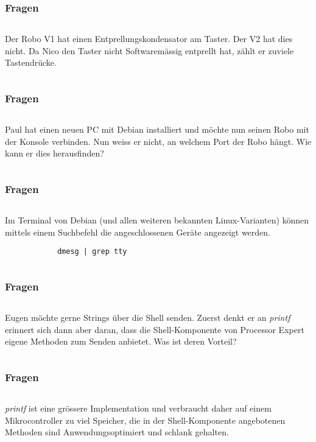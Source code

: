 \begin{frame}
	\frametitle{Fragen}
	\begin{column}{1\linewidth}
		Der Robo V1 hat einen Entprellungskondensator am Taster. Der V2 hat dies nicht. Da Nico den Taster nicht Softwaremässig entprellt hat, zählt er zuviele Tastendrücke.
	\end{column}
\end{frame}

\begin{frame}
	\frametitle{Fragen}
	\begin{column}{1\linewidth}
		Paul hat einen neuen PC mit Debian installiert und möchte nun seinen Robo mit der Konsole verbinden. Nun weiss er nicht, an welchem Port der Robo hängt. Wie kann er dies herausfinden?
	\end{column}
\end{frame}

\begin{frame}[fragile]
	\frametitle{Fragen}
	\begin{column}{1\linewidth}
		Im Terminal von Debian (und allen weiteren bekannten Linux-Varianten) können mittels einem Suchbefehl die angeschlossenen Geräte angezeigt werden.
		\begin{verbatim}
			dmesg | grep tty
		\end{verbatim}
	\end{column}
\end{frame}

\begin{frame}
	\frametitle{Fragen}
	\begin{column}{1\linewidth}
		Eugen möchte gerne Strings über die Shell senden. Zuerst denkt er an \textit{printf} erinnert sich dann aber daran, dass die Shell-Komponente von Processor Expert eigene Methoden zum Senden anbietet. Was ist deren Vorteil?
	\end{column}
\end{frame}

\begin{frame}
	\frametitle{Fragen}
	\begin{column}{1\linewidth}
		\textit{printf} ist eine grössere Implementation und verbraucht daher auf einem Mikrocontroller zu viel Speicher, die in der Shell-Komponente angebotenen Methoden sind Anwendungsoptimiert und schlank gehalten.
	\end{column}
\end{frame}


